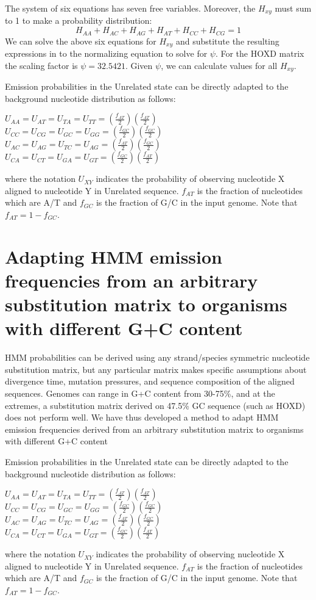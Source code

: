 \documentclass{llncs}
\begin{document}
The system of six equations has seven free variables.  Moreover, the $H_{xy}$ must sum to 1 to make a probability distribution:
\begin{equation}
H_{AA} + H_{AC} + H_{AG} + H_{AT} + H_{CC} + H_{CG} = 1
\end{equation}
We can solve the above six equations for $H_{xy}$ and substitute the
resulting expressions in to the normalizing equation to solve for
$\psi$. For the HOXD matrix the scaling factor is $\psi=32.5421$. Given
$\psi$, we can calculate values for all $H_{xy}$.

Emission probabilities in the Unrelated state can be directly adapted to the
background nucleotide distribution as follows:
\begin{center}
$U_{AA}=U_{AT}=U_{TA}=U_{TT}=(\frac{f_{AT}}{2})(\frac{f_{AT}}{2})$
$U_{CC}=U_{CG}=U_{GC}=U_{GG}=(\frac{f_{GC}}{2})(\frac{f_{GC}}{2})$
$U_{AC}=U_{AG}=U_{TC}=U_{AG}=(\frac{f_{AT}}{2})(\frac{f_{GC}}{2})$
$U_{CA}=U_{CT}=U_{GA}=U_{GT}=(\frac{f_{GC}}{2})(\frac{f_{AT}}{2})$
\end{center}
where the notation $U_{XY}$ indicates the probability of observing nucleotide X aligned to nucleotide Y in Unrelated sequence.  $f_{AT}$ is the fraction of nucleotides which are A/T and $f_{GC}$ is the fraction of G/C in the input genome.  Note that $f_{AT}=1-f_{GC}$.

\section*{Adapting HMM emission frequencies from an arbitrary substitution matrix to organisms with different G+C content}
HMM probabilities can be derived using any strand/species symmetric nucleotide substitution matrix,
but any particular matrix makes specific assumptions about divergence time, mutation pressures,
and sequence composition of the aligned sequences.
Genomes can range in G+C content from 30-75\%, and at the extremes,
a substitution matrix derived on 47.5\% GC sequence (such as HOXD) does not
perform well.  We have thus developed a method to adapt HMM emission
frequencies derived from an arbitrary substitution matrix
to organisms with different G+C content

Emission
probabilities in the Unrelated state can be directly adapted to the
background nucleotide distribution as follows:
\begin{center}
$U_{AA}=U_{AT}=U_{TA}=U_{TT}=(\frac{f_{AT}}{2})(\frac{f_{AT}}{2})$
$U_{CC}=U_{CG}=U_{GC}=U_{GG}=(\frac{f_{GC}}{2})(\frac{f_{GC}}{2})$
$U_{AC}=U_{AG}=U_{TC}=U_{AG}=(\frac{f_{AT}}{2})(\frac{f_{GC}}{2})$
$U_{CA}=U_{CT}=U_{GA}=U_{GT}=(\frac{f_{GC}}{2})(\frac{f_{AT}}{2})$
\end{center}
where the notation $U_{XY}$ indicates the probability of observing nucleotide X aligned to
nucleotide Y in Unrelated sequence.  $f_{AT}$ is the fraction of nucleotides which are A/T and
$f_{GC}$ is the fraction of G/C in the input genome.  Note that $f_{AT}=1-f_{GC}$.
\end{document}
